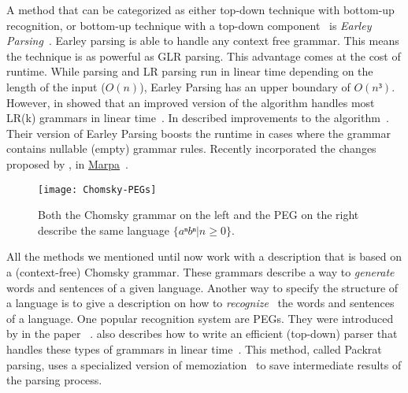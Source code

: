 A method that can be categorized as either top-down technique with bottom-up recognition, or bottom-up technique with a top-down component~\cite[p. 206]{grune2008parsing} is \emph{Earley Parsing}~\cite{earley1970efficient}. Earley parsing is able to handle any context free grammar. This means the technique is as powerful as GLR parsing. This advantage comes at the cost of runtime. While  parsing and LR parsing run in linear time depending on the length of the input ($O(n)$), Earley Parsing has an upper boundary of $O(n³)$. However, in \citeyear{leo1991general} \citeauthor{leo1991general} showed that an improved version of the algorithm handles most LR(k) grammars in linear time~\cite{kegler2011marpa, leo1991general}. In \citeyear{aycock2002practical} \citeauthor{aycock2002practical} described improvements to the algorithm~\cite{aycock2002practical}. Their version of Earley Parsing boosts the runtime in cases where the grammar contains nullable (empty) grammar rules. Recently \citeauthor{kegler2011marpa} incorporated the changes proposed by \citeauthor{leo1991general}, \citeauthor{aycock2002practical} in \href{http://savage.net.au/Marpa.html}{Marpa}~\cite{kegler2011marpa}.

\begin{figure}
  \centering
    \texttt{[image: Chomsky-PEGs]}
  \caption{Both the Chomsky grammar on the left and the PEG on the right describe the same language $ \{ aⁿ bⁿ | n ≥ 0 \} $.}
\end{figure}

All the methods we mentioned until now work with a description that is based on a (context-free) Chomsky grammar. These grammars describe a way to \emph{generate} words and sentences of a given language. Another way to specify the structure of a language is to give a description on how to \emph{recognize}~\cite[p. 506]{grune2008parsing} the words and sentences of a language. One popular recognition system are \glspl{PEG}. They were introduced by \citeauthor{ford2004parsing} in the paper ~\cite{ford2004parsing}. \citeauthor{ford2002packrat} also describes how to write an efficient (top-down) parser that handles these types of grammars in linear time~\cite{ford2002packrat}. This method, called Packrat parsing, uses a specialized version of memoziation~\cite[p. 1]{ford2002packrat} to save intermediate results of the parsing process.

